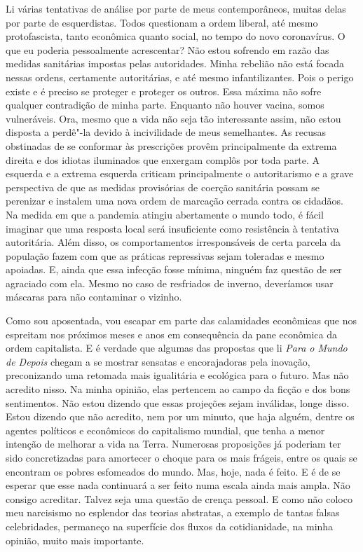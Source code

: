 Li várias tentativas de análise por parte de meus contemporâneos, muitas
delas por parte de esquerdistas. Todos questionam a ordem liberal, até
mesmo protofascista, tanto econômica quanto social, no tempo do novo
coronavírus. O que eu poderia pessoalmente acrescentar? Não estou
sofrendo em razão das medidas sanitárias impostas pelas autoridades.
Minha rebelião não está focada nessas ordens, certamente autoritárias, e
até mesmo infantilizantes. Pois o perigo existe e é preciso se proteger
e proteger os outros. Essa máxima não sofre qualquer contradição de
minha parte. Enquanto não houver vacina, somos vulneráveis. Ora, mesmo
que a vida não seja tão interessante assim, não estou disposta a
perdê"-la devido à incivilidade de meus semelhantes. As recusas
obstinadas de se conformar às prescrições provêm principalmente da
extrema direita e dos idiotas iluminados que enxergam complôs por toda
parte. A esquerda e a extrema esquerda criticam principalmente o
autoritarismo e a grave perspectiva de que as medidas provisórias de
coerção sanitária possam se perenizar e instalem uma nova ordem de
marcação cerrada contra os cidadãos. Na medida em que a pandemia atingiu
abertamente o mundo todo, é fácil imaginar que uma resposta local será
insuficiente como resistência à tentativa autoritária. Além disso, os
comportamentos irresponsáveis de certa parcela da população fazem com
que as práticas repressivas sejam toleradas e mesmo apoiadas. E, ainda
que essa infecção fosse mínima, ninguém faz questão de ser agraciado com
ela. Mesmo no caso de resfriados de inverno, deveríamos usar máscaras
para não contaminar o vizinho.

Como sou aposentada, vou escapar em parte das calamidades econômicas que
nos espreitam nos próximos meses e anos em consequência da pane
econômica da ordem capitalista. E é verdade que algumas das propostas
que li \emph{Para o Mundo de Depois} chegam a se mostrar sensatas e
encorajadoras pela inovação, preconizando uma retomada mais igualitária
e ecológica para o futuro. Mas não acredito nisso. Na minha opinião,
elas pertencem ao campo da ficção e dos bons sentimentos. Não estou
dizendo que essas projeções sejam inválidas, longe disso. Estou dizendo
que não acredito, nem por um minuto, que haja alguém, dentre os agentes
políticos e econômicos do capitalismo mundial, que tenha a menor
intenção de melhorar a vida na Terra. Numerosas proposições já poderiam
ter sido concretizadas para amortecer o choque para os mais frágeis,
entre os quais se encontram os pobres esfomeados do mundo. Mas, hoje,
nada é feito. E é de se esperar que esse nada continuará a ser feito
numa escala ainda mais ampla. Não consigo acreditar. Talvez seja uma
questão de crença pessoal. E como não coloco meu narcisismo no esplendor
das teorias abstratas, a exemplo de tantas falsas celebridades,
permaneço na superfície dos fluxos da cotidianidade, na minha opinião,
muito mais importante.


